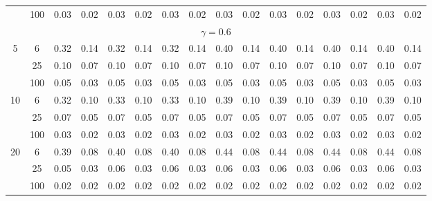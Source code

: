 \documentclass[
  man]{apa6}
\newenvironment{lltable}{\begin{landscape}\centering\begin{ThreePartTable}}{\end{ThreePartTable}\end{landscape}}
\begin{document}
\begin{lltable}
{\begin{longtable}{cccccccccccccccc}
 & 100 & 0.03 & 0.02 & 0.03 & 0.02 & 0.03 & 0.02 & 0.03 & 0.02 & 0.03 & 0.02 & 0.03 & 0.02 & 0.03 & 0.02\\
\multicolumn{16}{c}{$\gamma = 0.6$}\\
5 & 6 & 0.32 & 0.14 & 0.32 & 0.14 & 0.32 & 0.14 & 0.40 & 0.14 & 0.40 & 0.14 & 0.40 & 0.14 & 0.40 & 0.14\\
 & 25 & 0.10 & 0.07 & 0.10 & 0.07 & 0.10 & 0.07 & 0.10 & 0.07 & 0.10 & 0.07 & 0.10 & 0.07 & 0.10 & 0.07\\
 & 100 & 0.05 & 0.03 & 0.05 & 0.03 & 0.05 & 0.03 & 0.05 & 0.03 & 0.05 & 0.03 & 0.05 & 0.03 & 0.05 & 0.03\\
10 & 6 & 0.32 & 0.10 & 0.33 & 0.10 & 0.33 & 0.10 & 0.39 & 0.10 & 0.39 & 0.10 & 0.39 & 0.10 & 0.39 & 0.10\\
 & 25 & 0.07 & 0.05 & 0.07 & 0.05 & 0.07 & 0.05 & 0.07 & 0.05 & 0.07 & 0.05 & 0.07 & 0.05 & 0.07 & 0.05\\
 & 100 & 0.03 & 0.02 & 0.03 & 0.02 & 0.03 & 0.02 & 0.03 & 0.02 & 0.03 & 0.02 & 0.03 & 0.02 & 0.03 & 0.02\\
20 & 6 & 0.39 & 0.08 & 0.40 & 0.08 & 0.40 & 0.08 & 0.44 & 0.08 & 0.44 & 0.08 & 0.44 & 0.08 & 0.44 & 0.08\\
 & 25 & 0.05 & 0.03 & 0.06 & 0.03 & 0.06 & 0.03 & 0.06 & 0.03 & 0.06 & 0.03 & 0.06 & 0.03 & 0.06 & 0.03\\
 & 100 & 0.02 & 0.02 & 0.02 & 0.02 & 0.02 & 0.02 & 0.02 & 0.02 & 0.02 & 0.02 & 0.02 & 0.02 & 0.02 & 0.02\\
\bottomrule
\end{longtable}

}

\end{lltable}
\end{document}
